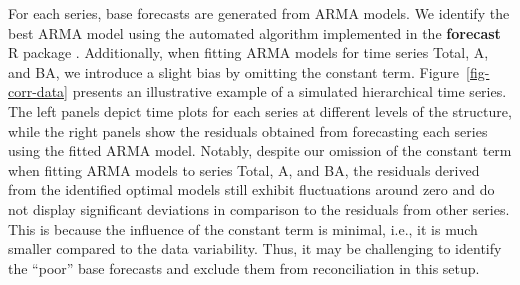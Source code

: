 \documentclass[
  11pt]{article}
\theoremstyle{plain}
\theoremstyle{remark}
\begin{document}
For each series, base forecasts are generated from ARMA models. We
identify the best ARMA model using the automated algorithm implemented
in the \textbf{forecast} R package \citep{HK08}. Additionally, when
fitting ARMA models for time series Total, A, and BA, we introduce a
slight bias by omitting the constant term. Figure~\ref{fig-corr-data}
presents an illustrative example of a simulated hierarchical time
series. The left panels depict time plots for each series at different
levels of the structure, while the right panels show the residuals
obtained from forecasting each series using the fitted ARMA model.
Notably, despite our omission of the constant term when fitting ARMA
models to series Total, A, and BA, the residuals derived from the
identified optimal models still exhibit fluctuations around zero and do
not display significant deviations in comparison to the residuals from
other series. This is because the influence of the constant term is
minimal, i.e., it is much smaller compared to the data variability.
Thus, it may be challenging to identify the ``poor'' base forecasts and
exclude them from reconciliation in this setup.
\end{document}
